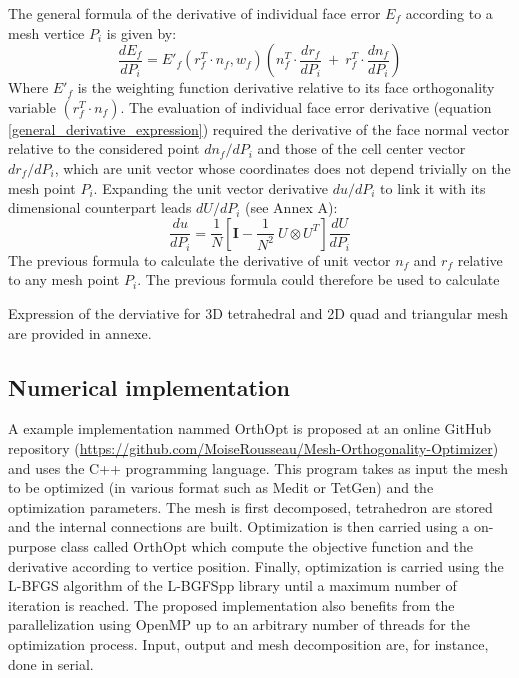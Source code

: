 \documentclass[11pt]{article}
\begin{document}
The general formula of the derivative of individual face error $E_f$ according to a mesh vertice $P_i$ is given by:
%
\begin{equation}
\frac{dE_f}{dP_i} = E'_f\left( r_f^T \cdot n_f, w_f \right) \left(n_f^T \cdot \frac{d r_f}{dP_i}\ +\ r_f^T \cdot \frac{d n_f}{dP_i}\right)
\label{general_derivative_expression}
\end{equation}
%
Where $E'_f$ is the weighting function derivative relative to its face orthogonality variable $(r_f^T \cdot n_f)$.
The evaluation of individual face error derivative (equation \ref{general_derivative_expression}) required the derivative of the face normal vector relative to the considered point $d n_f / dP_i$ and those of the cell center vector $d r_f / dP_i$, which are unit vector whose coordinates does not depend trivially on the mesh point $P_i$.
Expanding the unit vector derivative $du/dP_i$ to link it with its dimensional counterpart leads $dU/dP_i$ (see Annex A):
%
\begin{equation}
\frac{du}{dP_i} = \frac{1}{N} \left[ \boldsymbol{I} - \frac{1}{N^2}\ U \otimes U^T \right] \frac{dU}{dP_i}
\end{equation}
%
The previous formula to calculate the derivative of unit vector $n_f$ and $r_f$ relative to any mesh point $P_i$.
The previous formula could therefore be used to calculate 

Expression of the derviative for 3D tetrahedral and 2D quad and triangular mesh are provided in annexe.


\subsection{Numerical implementation}

A example implementation nammed OrthOpt is proposed at an online GitHub repository (\href{https://github.com/MoiseRousseau/Mesh-Orthogonality-Optimizer}{https://github.com/MoiseRousseau/Mesh-Orthogonality-Optimizer}) and uses the C++ programming language. 
This program takes as input the mesh to be optimized (in various format such as Medit or TetGen) and the optimization parameters.
The mesh is first decomposed, tetrahedron are stored and the internal connections are built. 
Optimization is then carried using a on-purpose class called OrthOpt which compute the objective function and the derivative according to vertice position. 
Finally, optimization is carried using the L-BFGS algorithm of the L-BGFSpp library \cite{} until a maximum number of iteration is reached.
The proposed implementation also benefits from the parallelization using OpenMP up to an arbitrary number of threads for the optimization process.
Input, output and mesh decomposition are, for instance, done in serial.
\end{document}
